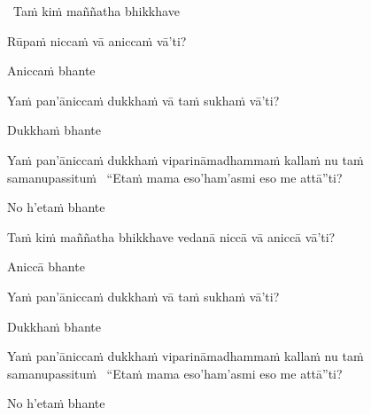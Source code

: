 \begin{pali-leader}
  \anglebracketleft\ \hspace{-0.5mm}Taṁ kiṁ maññatha bhikkhave \hspace{-0.5mm}\anglebracketright\
\end{pali-leader}
\begin{pali-hangtogether}
  Rūpaṁ niccaṁ vā aniccaṁ vā'ti?
\end{pali-hangtogether}
\begin{pali-hangtogether}
  Aniccaṁ bhante
\end{pali-hangtogether}
\begin{pali-hangtogether}
  Yaṁ pan'āniccaṁ dukkhaṁ vā taṁ sukhaṁ vā'ti?
\end{pali-hangtogether}
\begin{pali-hangtogether}
  Dukkhaṁ bhante
\end{pali-hangtogether}
\begin{pali-hangtogether}
  Yaṁ pan'āniccaṁ dukkhaṁ viparināmadhammaṁ kallaṁ nu taṁ samanupassituṁ \breathmark\ ``Etaṁ mama eso'ham'asmi eso me attā''ti?
\end{pali-hangtogether}
\begin{pali-hangtogether}
  No h'etaṁ bhante
\end{pali-hangtogether}

\begin{pali-hang}
  Taṁ kiṁ maññatha bhikkhave vedanā niccā vā aniccā vā'ti?
\end{pali-hang}
\begin{pali-hangtogether}
  Aniccā bhante
\end{pali-hangtogether}
\begin{pali-hangtogether}
  Yaṁ pan'āniccaṁ dukkhaṁ vā taṁ sukhaṁ vā'ti?
\end{pali-hangtogether}
\begin{pali-hangtogether}
  Dukkhaṁ bhante
\end{pali-hangtogether}
\begin{pali-hangtogether}
  Yaṁ pan'āniccaṁ dukkhaṁ viparināmadhammaṁ kallaṁ nu taṁ samanupassituṁ \breathmark\ ``Etaṁ mama eso'ham'asmi eso me attā''ti?
\end{pali-hangtogether}
\begin{pali-hangtogether}
  No h'etaṁ bhante
\end{pali-hangtogether}

